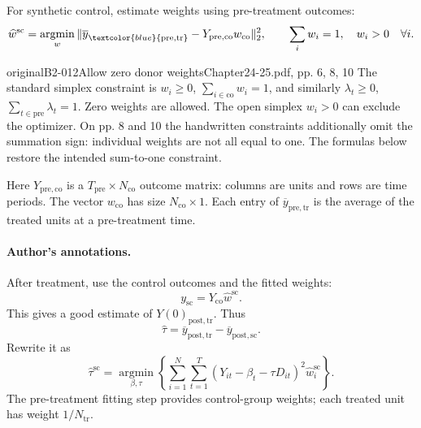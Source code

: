 For synthetic control, estimate weights using pre-treatment outcomes:
\[
\widehat w^{\mathrm{sc}}
=\operatorname*{argmin}_{w}
\|\overline y_{\textcolor{blue}{\mathrm{pre,tr}}}-Y_{\mathrm{pre,co}}w_{\mathrm{co}}\|_2^2,
\qquad \sum_iw_i=1,\quad w_i>0\quad\forall i.
\]
\begin{reviewnote}{original}{B2-012}{Allow zero donor weights}{Chapter24-25.pdf, pp. 6, 8, 10}
The standard simplex constraint is \(w_i\geq0\), \(\sum_{i\in\mathrm{co}}w_i=1\), and similarly \(\lambda_t\geq0\), \(\sum_{t\in\mathrm{pre}}\lambda_t=1\). Zero weights are allowed. The open simplex \(w_i>0\) can exclude the optimizer. On pp. 8 and 10 the handwritten constraints additionally omit the summation sign: individual weights are not all equal to one. The formulas below restore the intended sum-to-one constraint.
\par{}
\end{reviewnote}

Here \(Y_{\mathrm{pre,co}}\) is a \(T_{\mathrm{pre}}\times N_{\mathrm{co}}\) outcome matrix: columns are units and rows are time periods. The vector \(w_{\mathrm{co}}\) has size \(N_{\mathrm{co}}\times1\). Each entry of \(\overline y_{\mathrm{pre,tr}}\) is the average of the treated units at a pre-treatment time.

\paragraph{Author's annotations.}
 After treatment, use the control outcomes and the fitted weights:
\[
y_{\mathrm{sc}}=Y_{\mathrm{co}}\widehat w^{\mathrm{sc}}.
\]
This gives a good estimate of \(Y(0)_{\mathrm{post,tr}}\). Thus
\[
\widehat\tau=\overline y_{\mathrm{post,tr}}-\overline y_{\mathrm{post,sc}}.
\]
Rewrite it as
\[
\widehat\tau^{\mathrm{sc}}
=\operatorname*{argmin}_{\beta,\tau}
\left\{\sum_{i=1}^{N}\sum_{t=1}^{T}
(Y_{it}-\beta_t-\tau D_{it})^2\widehat w_i^{\mathrm{sc}}\right\}.
\]
The pre-treatment fitting step provides control-group weights; each treated unit has weight \(1/N_{\mathrm{tr}}\). 

